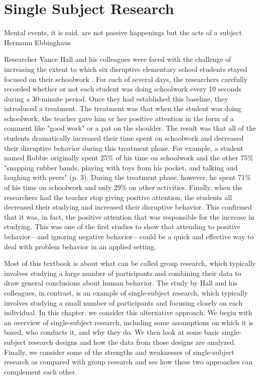\chapter{Single Subject Research}

Mental events, it is said, are not passive happenings but the acts of a subject
Hermann Ebbinghaus

Researcher Vance Hall and his colleagues were faced with the challenge of increasing the extent to which six disruptive elementary school students stayed focused on their schoolwork \citep{hall_effects_1968}. For each of several days, the researchers carefully recorded whether or not each student was doing schoolwork every 10 seconds during a 30-minute period. Once they had established this baseline, they introduced a treatment. The treatment was that when the student was doing schoolwork, the teacher gave him or her positive attention in the form of a comment like "good work" or a pat on the shoulder. The result was that all of the students dramatically increased their time spent on schoolwork and decreased their disruptive behavior during this treatment phase. For example, a student named Robbie originally spent 25\% of his time on schoolwork and the other 75\% "snapping rubber bands, playing with toys from his pocket, and talking and laughing with peers" (p. 3). During the treatment phase, however, he spent 71\% of his time on schoolwork and only 29\% on other activities. Finally, when the researchers had the teacher stop giving positive attention, the students all decreased their studying and increased their disruptive behavior. This confirmed that it was, in fact, the positive attention that was responsible for the increase in studying. This was one of the first studies to show that attending to positive behavior---and ignoring negative behavior---could be a quick and effective way to deal with problem behavior in an applied setting.

Most of this textbook is about what can be called group research, which typically involves studying a large number of participants and combining their data to draw general conclusions about human behavior. The study by Hall and his colleagues, in contrast, is an example of single-subject research, which typically involves studying a small number of participants and focusing closely on each individual. In this chapter, we consider this alternative approach. We begin with an overview of single-subject research, including some assumptions on which it is based, who conducts it, and why they do. We then look at some basic single-subject research designs and how the data from those designs are analyzed. Finally, we consider some of the strengths and weaknesses of single-subject research as compared with group research and see how these two approaches can complement each other.

